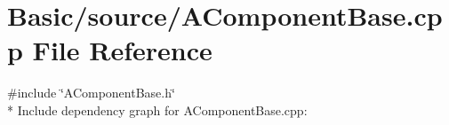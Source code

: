 \section{Basic/source/\-A\-Component\-Base.cpp File Reference}
\label{AComponentBase_8cpp}
{\ttfamily \#include \char`\"{}A\-Component\-Base.\-h\char`\"{}}\\*
Include dependency graph for A\-Component\-Base.\-cpp\-:

